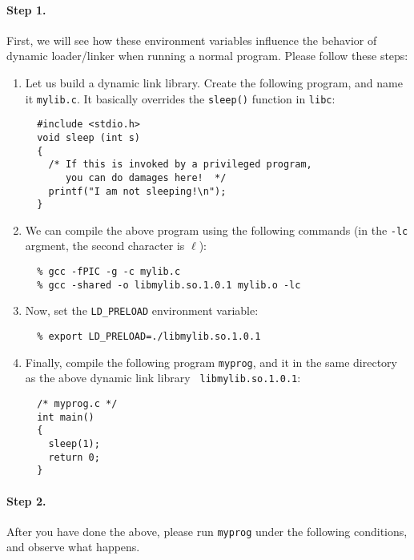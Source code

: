 \paragraph{Step 1.} 
First, we will see how these environment variables influence the 
behavior of dynamic loader/linker when running a normal program. 
Please follow these steps:


  \begin{enumerate}
  \item Let us build a dynamic link library. Create the following program,
  and name it {\tt mylib.c}. It basically overrides the {\tt sleep()} function 
  in {\tt libc}:
  \begin{verbatim}
  #include <stdio.h>
  void sleep (int s)
  {
    /* If this is invoked by a privileged program, 
       you can do damages here!  */
    printf("I am not sleeping!\n");
  }
  \end{verbatim}

  \item We can compile the above program using the following commands (in the 
  {\tt -lc} argment, the second character is $\ell$):
  \begin{verbatim}
  % gcc -fPIC -g -c mylib.c
  % gcc -shared -o libmylib.so.1.0.1 mylib.o -lc
  \end{verbatim}

  

  \item Now, set the {\tt LD\_PRELOAD} environment variable:  
  \begin{verbatim}
  % export LD_PRELOAD=./libmylib.so.1.0.1  
  \end{verbatim}

  \item Finally, compile the following program {\tt myprog}, and it 
  in the same directory as the above dynamic link library {\tt
  libmylib.so.1.0.1}:
  \begin{verbatim}
  /* myprog.c */
  int main()
  {
    sleep(1);
    return 0;
  }
  \end{verbatim}
  \end{enumerate}


\paragraph{Step 2.} 
After you have done the above, please run {\tt myprog} under the following
conditions, and observe what happens. 

